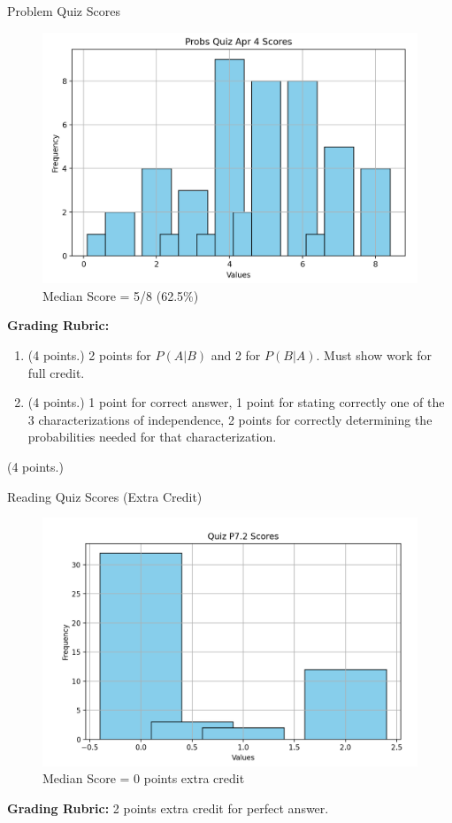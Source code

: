 \documentclass[10pt]{beamer}
\begin{document}
\begin{frame}{Problem Quiz Scores}
\small 
\begin{figure}[ht]
        \centering
        \includegraphics[width=.6\textwidth]{images/problem_quiz_scores}
   		 \caption{Median Score = 5/8 (62.5\%)}
\end{figure}
\vfill 
\vspace{-.3cm}
\textbf{Grading Rubric:}  
\begin{enumerate}
	\item (4 points.) 2 points for $P(A|B)$ and 2 for $P(B|A)$.  Must show work for full credit. 
	\item (4 points.) 1 point for correct answer,  1 point for stating correctly one of the 3 characterizations of independence, 2 points for correctly determining the probabilities needed for that characterization.  
\end{enumerate}(4 points.) 


\end{frame}	

\begin{frame}{Reading Quiz Scores (Extra Credit)}
\begin{figure}[ht]
        \centering
        \includegraphics[width=.7\textwidth]{images/reading_quiz_scores}
   		 \caption{Median Score = 0 points extra credit}
\end{figure}
\vfill 
\textbf{Grading Rubric:}  2 points extra credit for perfect answer.
\end{frame}	
\end{document}
